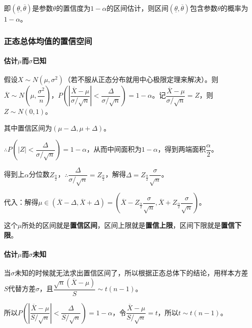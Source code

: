 \documentclass[UTF8, 12pt]{ctexart}
\begin{document}
即$(\underline{\theta},\overline{\theta})$是参数$\theta$的置信度为$1-\alpha$的区间估计，则区间$(\underline{\theta},\overline{\theta})$包含参数$\theta$的概率为$1-\alpha$。

\subsubsection{正态总体均值的置信空间}

\paragraph{\texorpdfstring{估计$\mu$而$\sigma$已知}{}} \leavevmode \medskip

假设$X\sim N(\mu,\sigma^2)$（若不服从正态分布就用中心极限定理来解决）。则$\overline{X}\sim N\left(\mu,\dfrac{\sigma^2}{n}\right)$，$P\left(\left\vert\dfrac{\overline{X}-\mu}{\sigma/\sqrt{n}}\right\vert<\dfrac{\Delta}{\sigma/\sqrt{n}}\right)=1-\alpha$。记$\dfrac{\overline{X}-\mu}{\sigma/\sqrt{n}}=Z$，则$Z\sim N(0,1)$。

其中置信区间为$(\mu-\Delta,\mu+\Delta)$。

$\therefore P\left(\vert Z\vert<\dfrac{\Delta}{\sigma/\sqrt{n}}\right)=1-\alpha$，从而中间面积为$1-\alpha$，得到两端面积$\dfrac{\alpha}{2}$。

得到上$\alpha$分位数$Z_\frac{\alpha}{2}$，$\therefore\dfrac{\Delta}{\sigma/\sqrt{n}}=Z_\frac{\alpha}{2}$，解得$\Delta=Z_\frac{\alpha}{2}\dfrac{\sigma}{\sqrt{n}}$。

代入：解得$\mu\in(\overline{X}-\Delta,\overline{X}+\Delta)=(\overline{X}-Z_\frac{\alpha}{2}\dfrac{\sigma}{\sqrt{n}},\overline{X}+Z_\frac{\alpha}{2}\dfrac{\sigma}{\sqrt{n}})$。

这个$\mu$所处的区间就是\textbf{置信区间}，区间上限就是\textbf{置信上限}，区间下限就是\textbf{置信下限}。

\paragraph{\texorpdfstring{估计$\mu$而$\sigma$未知}{}} \leavevmode \medskip

当$\sigma$未知的时候就无法求出置信区间了，所以根据正态总体下的结论，用样本方差$S$代替方差$\sigma$，且$\dfrac{\sqrt{n}(\overline{X}-\mu)}{S}\sim t(n-1)$。

所以$P\left(\left\vert\dfrac{\overline{X}-\mu}{S/\sqrt{n}}\right\vert<\dfrac{\Delta}{S/\sqrt{n}}\right)=1-\alpha$，令$\dfrac{\overline{X}-\mu}{S/\sqrt{n}}=t$，所以$t\sim t(n-1)$。
\end{document}
